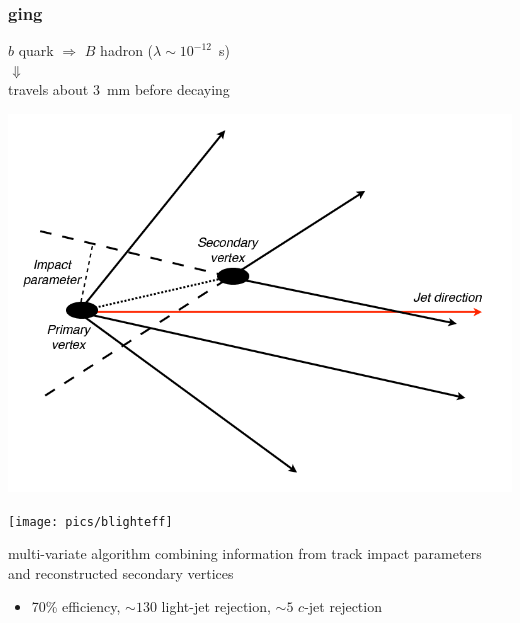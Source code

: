 \begin{frame}\frametitle{\btag ging}
\centering\footnotesize

\begin{minipage}{.5\textwidth}\centering

$b$ quark $\Rightarrow$ $B$ hadron ($\lambda\sim 10^{-12}$~s)\\
{\large$\Downarrow$}\\
travels about 3~mm before decaying

\includegraphics[width=.5\textwidth]{../objectsreconstruction/figures/Picture-b-tagging-2.png}

\end{minipage}\begin{minipage}{.5\textwidth}\centering

\texttt{[image: pics/blighteff]}

\end{minipage}

\myskip


multi-variate algorithm combining information from {\cccolor track impact parameters}\\
and {\cccolor reconstructed secondary vertices} 

\begin{itemize}
\item 70\% efficiency, $\sim 130$ light-jet rejection, $\sim 5$ $c$-jet rejection
\end{itemize}

\end{frame}




